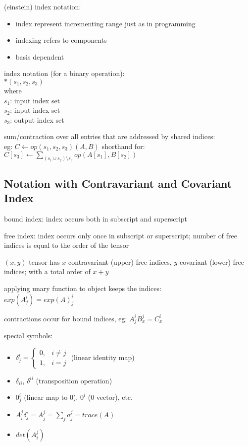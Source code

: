 \documentclass[8pt]{extarticle}
\begin{document}
\begin{multicols*}{2}
  (einstein) index notation:
  \begin{itemize}
  \item index represent incrementing range just as in programming
  \item indexing refers to components
  \item basis dependent
  \end{itemize}
  
  index notation (for a binary operation):\\
  $*(s_1,s_2,s_3)$\\
  where\\
  $s_1$: input index set\\
  $s_2$: input index set\\
  $s_3$: output index set

  sum/contraction over all entries that are addressed by shared indices:\\
  eg: $C \leftarrow op(s_1, s_2, s_3)(A,B)$ shorthand for:\\
  $C[s_3] \leftarrow \sum_{(s_1 \cup s_2) \setminus s_3} op(A[s_1], B[s_2])$

  \subsection{Notation with Contravariant and Covariant Index} 

  bound index: index occurs both in subscript and superscript

  free index: index occurs only once in subscript or superscript; number of free indices is equal to the order of the tensor

  $(x,y)$-tensor has $x$ contravariant (upper) free indices, $y$ covariant (lower) free indices; with a total order of $x+y$
    
  applying unary function to object keeps the indices:\\
  $exp(A^i_j) = exp(A)^i_j$

  contractions occur for bound indices, eg: $A^i_j B^j_x = C^i_x$
  
  special symbols:
  \begin{itemize}
  \item
    $\delta^i_j = \begin{cases}
    0, & i \neq j\\
    1, & i = j
                  \end{cases}$ (linear identity map)
  \item $\delta_{ii}$, $\delta^{ii}$ (transposition operation)
  \item $0^i_j $ (linear map to 0), $0^i$ (0 vector), etc.
  \item $A^j_i \delta^i_j = A^j_j = \sum_j a^j_j = trace(A)$
  \item $det(A^j_i)$
  \end{itemize}
  

\end{multicols*}
\end{document}
